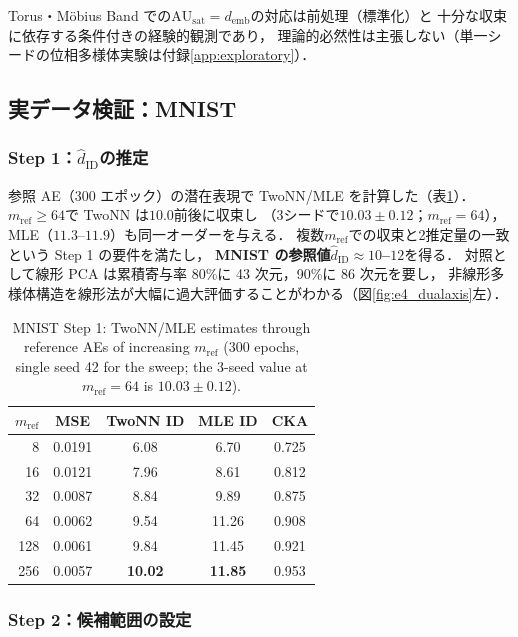 \documentclass[11pt,a4paper]{jsarticle}
\newcommand{\hatdID}{\hat{d}_{\mathrm{ID}}}
\newcommand{\AUsat}{\mathrm{AU}_{\mathrm{sat}}}
\newcommand{\demb}{d_{\mathrm{emb}}}
\begin{document}
Torus・M\"obius Band での$\AUsat = \demb$の対応は前処理（標準化）と
十分な収束に依存する条件付きの経験的観測であり，
理論的必然性は主張しない（単一シードの位相多様体実験は付録\ref{app:exploratory}）．

\subsection{実データ検証：MNIST}\label{sec:exp_mnist}

\subsubsection{Step 1：$\hatdID$の推定}

参照 AE（300 エポック）の潜在表現で TwoNN/MLE を計算した（表\ref{tab:mnist_s1}）．
$m_{\mathrm{ref}} \geq 64$で TwoNN は$10.0$前後に収束し
（3シードで$10.03 \pm 0.12$；$m_{\mathrm{ref}} = 64$），
MLE（$11.3$--$11.9$）も同一オーダーを与える．
複数$m_{\mathrm{ref}}$での収束と2推定量の一致という Step 1 の要件を満たし，
\textbf{MNIST の参照値$\hatdID \approx 10$--$12$}を得る．
対照として線形 PCA は累積寄与率 80\%に 43 次元，90\%に 86 次元を要し，
非線形多様体構造を線形法が大幅に過大評価することがわかる（図\ref{fig:e4_dualaxis}左）．

\begin{table}[H]
\centering
\caption{MNIST Step 1: TwoNN/MLE estimates through reference AEs of
increasing $m_{\mathrm{ref}}$ (300 epochs, single seed 42 for the sweep;
the 3-seed value at $m_{\mathrm{ref}} = 64$ is $10.03 \pm 0.12$).}
\label{tab:mnist_s1}
\small
\begin{tabular}{rcccc}
\toprule
$m_{\mathrm{ref}}$ & MSE & TwoNN ID & MLE ID & CKA \\
\midrule
8   & 0.0191 & 6.08 & 6.70 & 0.725 \\
16  & 0.0121 & 7.96 & 8.61 & 0.812 \\
32  & 0.0087 & 8.84 & 9.89 & 0.875 \\
64  & 0.0062 & 9.54 & 11.26 & 0.908 \\
128 & 0.0061 & 9.84 & 11.45 & 0.921 \\
256 & 0.0057 & \textbf{10.02} & \textbf{11.85} & 0.953 \\
\bottomrule
\end{tabular}
\end{table}

\subsubsection{Step 2：候補範囲の設定}
\end{document}
